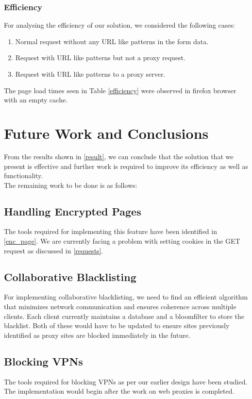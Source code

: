 \documentclass[a4paper,11pt,twocolumn]{article}
\begin{document}
\subsubsection{Efficiency}
For analysing the efficiency of our solution, we considered the following cases:
\begin{enumerate}
	\item{Normal request without any URL like patterns in the form data.}
	\item{Request with URL like patterns but not a proxy request.}
	\item{Request with URL like patterns to a proxy server.}
\end{enumerate}

The page load times seen in Table \ref{efficiency} were observed in firefox browser with an empty cache.

\section{Future Work and Conclusions}
From the results shown in \ref{result}, we can conclude that the solution that we present is effective and further work is required to improve its efficiency as well as functionality. \\

The remaining work to be done is as follows:

\subsection{Handling Encrypted Pages}
The tools required for implementing this feature have been identified in \ref{enc_page}. We are currently facing a problem with setting cookies in the GET request as discussed in \ref{requests}.

\subsection{Collaborative Blacklisting}
For implementing collaborative blacklisting, we need to find an efficient algorithm that minimizes network communication and ensures coherence across multiple clients. Each client currently maintains a database and a bloomfilter to store the blacklist. Both of these would have to be updated to ensure sites previously identified as proxy sites are blocked immediately in the future. 
\subsection{Blocking VPNs}
The tools required for blocking VPNs as per our earlier design have been studied. The implementation would begin after the work on web proxies is completed.
\end{document}
